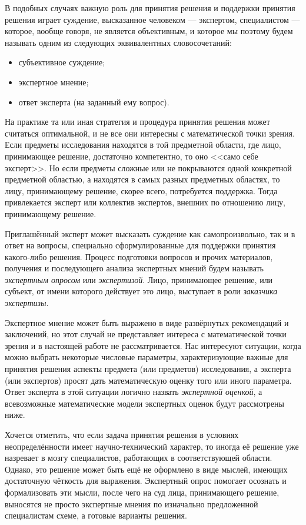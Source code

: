 В подобных случаях важную роль для принятия решения и поддержки принятия решения играет суждение, высказанное человеком --- экспертом, специалистом --- которое, вообще говоря, не является объективным, и которое мы поэтому будем называть одним из следующих эквивалентных словосочетаний:
 \begin{itemize}
	\item субъективное суждение;
	\item экспертное мнение;
	\item ответ эксперта (на заданный ему вопрос). 
 \end{itemize}

На практике та или иная стратегия и процедура принятия решения может считаться оптимальной, и не все они интересны с математической точки зрения. Если предметы исследования находятся в той предметной области, где лицо, принимающее решение, достаточно компетентно, то оно <<само себе эксперт>>. Но если предметы сложные или не покрываются одной конкретной предметной областью, а находятся в самых разных предметных областях, то лицу, принимающему решение, скорее всего, потребуется  поддержка. Тогда привлекается эксперт или коллектив экспертов, внешних по отношению лицу, принимающему решение.
 
Приглашённый эксперт может высказать суждение как самопроизвольно, так и в ответ на вопросы, специально сформулированные для поддержки принятия какого-либо решения. Процесс подготовки вопросов и прочих материалов, получения и последующего анализа экспертных мнений будем называть {\sl экспертным опросом} или {\sl экспертизой}. Лицо, принимающее решение, или субъект, от имени которого действует это лицо, выступает в роли {\sl заказчика экспертизы}.
 
Экспертное мнение может быть выражено в виде развёрнутых рекомендаций и заключений, но этот случай не представляет интереса с математической точки зрения и в настоящей работе не рассматривается. Нас интересуют ситуации, когда можно выбрать некоторые числовые параметры, характеризующие важные для принятия решения аспекты предмета (или предметов) исследования, а эксперта (или экспертов) просят дать математическую оценку того или иного параметра. Ответ эксперта в этой ситуации логично назвать {\sl экспертной оценкой}, а всевозможные математические модели экспертных оценок будут рассмотрены ниже.  
 
Хочется отметить, что если задача принятия решения в условиях неопределённости имеет научно-технический характер, то иногда её решение уже назревает в мозгу специалистов, работающих в соответствующей области. Однако, это решение может быть ещё не оформлено в виде мыслей, имеющих достаточную чёткость для выражения. Экспертный опрос помогает осознать и формализовать эти мысли, после чего на суд лица, принимающего решение, выносятся не просто экспертные мнения по изначально предложенной специалистам схеме, а готовые варианты решения. 

